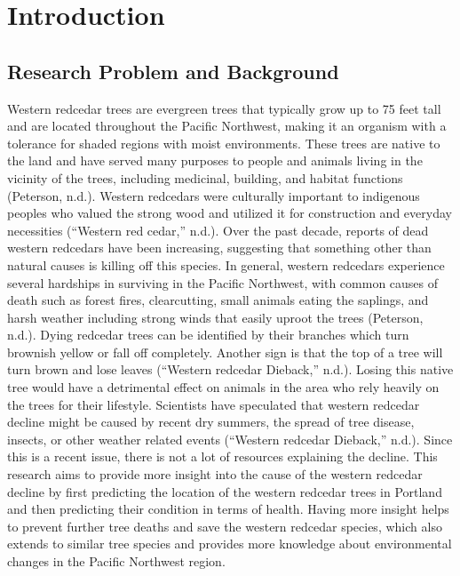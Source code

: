\documentclass[12pt,twoside]{reedthesis}
\begin{document}
\mainmatter %
\pagestyle{fancyplain} %

\hypertarget{introduction}{%
\chapter*{Introduction}\label{introduction}}

\clearpage

\hypertarget{research-problem-and-background}{%
\section{Research Problem and Background}\label{research-problem-and-background}}

Western redcedar trees are evergreen trees that typically grow up to 75 feet tall and are located throughout the Pacific Northwest, making it an organism with a tolerance for shaded regions with moist environments. These trees are native to the land and have served many purposes to people and animals living in the vicinity of the trees, including medicinal, building, and habitat functions (Peterson, n.d.). Western redcedars were culturally important to indigenous peoples who valued the strong wood and utilized it for construction and everyday necessities (``Western red cedar,'' n.d.). Over the past decade, reports of dead western redcedars have been increasing, suggesting that something other than natural causes is killing off this species. In general, western redcedars experience several hardships in surviving in the Pacific Northwest, with common causes of death such as forest fires, clearcutting, small animals eating the saplings, and harsh weather including strong winds that easily uproot the trees (Peterson, n.d.). Dying redcedar trees can be identified by their branches which turn brownish yellow or fall off completely. Another sign is that the top of a tree will turn brown and lose leaves (``Western redcedar Dieback,'' n.d.). Losing this native tree would have a detrimental effect on animals in the area who rely heavily on the trees for their lifestyle. Scientists have speculated that western redcedar decline might be caused by recent dry summers, the spread of tree disease, insects, or other weather related events (``Western redcedar Dieback,'' n.d.). Since this is a recent issue, there is not a lot of resources explaining the decline. This research aims to provide more insight into the cause of the western redcedar decline by first predicting the location of the western redcedar trees in Portland and then predicting their condition in terms of health. Having more insight helps to prevent further tree deaths and save the western redcedar species, which also extends to similar tree species and provides more knowledge about environmental changes in the Pacific Northwest region.
\end{document}
